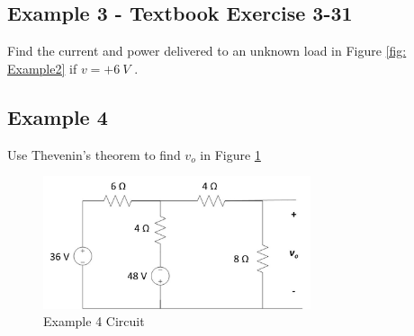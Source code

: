 \documentclass{handout}
\begin{document}
\subsection{Example 3 - Textbook Exercise 3-31}
Find the current and power delivered to an unknown load in Figure \ref{fig: Example2} if $v=+6\ V$ .


\newpage
\clearpage
\pagebreak

\subsection{Example 4}
Use Thevenin's theorem to find $v_o$ in Figure \ref{fig: Example4}
\begin{figure} [h t b]
\centering
\includegraphics[width=0.7\textwidth]{Example4.jpg}
\caption{Example 4 Circuit}
\label{fig: Example4}
\end{figure}
\end{document}
